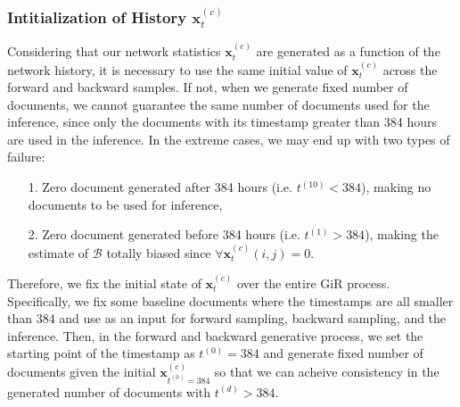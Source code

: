         \subsubsection{Intitialization of History $\boldsymbol{x}_t^{(c)}$} \label{subsubsec: Initial history issue}
        Considering that our network statistics $\boldsymbol{x}_t^{(c)}$ are generated as a function of the network history, it is necessary to use the same initial value of $\boldsymbol{x}_t^{(c)}$ across the forward and backward samples. If not, when we generate fixed number of documents, we cannot guarantee the same number of documents used for the inference, since only the documents with its timestamp greater than 384 hours are used in the inference. In the extreme cases, we may end up with two types of failure:
        \begin{itemize}
        	\item[1.] Zero document generated after 384 hours (i.e. $t^{(10)} < 384$), making no documents to be used for inference,
        	\item[2.] Zero document generated before 384 hours (i.e. $t^{(1)} > 384$), making the estimate of $\mathcal{B}$ totally biased since $\forall  \boldsymbol{x}_t^{(c)}(i, j) = 0$. 
        \end{itemize}
        Therefore, we fix the initial state of $\boldsymbol{x}_t^{(c)}$ over the entire GiR process. Specifically, we fix some baseline documents where the timestamps are all smaller than 384 and use as an input for forward sampling, backward sampling, and the inference. Then, in the forward and backward generative process, we set the starting point of the timestamp as $t^{(0)} = 384$ and generate fixed number of documents given the initial $\boldsymbol{x}_{t^{(0)} = 384}^{(c)}$ so that we can acheive consistency in the generated number of documents with $t^{(d)} > 384$.
